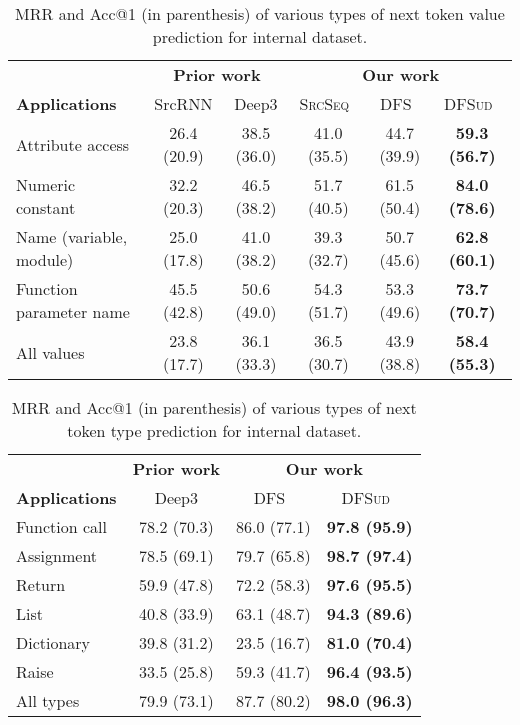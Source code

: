 \documentclass[nonacm, sigconf]{acmart}
\newcommand{\abbr}[1]{\textsc{#1}~}
\newcommand{\SrcSeq}{\abbr{SrcSeq}} \newcommand{\SrcRNN}{\abbr{SrcRNN}} \newcommand{\LeafSeq}{\abbr{LeafSeq}} \newcommand{\RootPath}{\abbr{RootPath}} \newcommand{\LeafTokens}{\abbr{LeafTokens}} \newcommand{\DFS}{\abbr{DFS}} \newcommand{\TreeRel}{\abbr{DFS{ud}}} \newcommand{\TreeReli}{\abbr{DFS{ud+}}}
\begin{document}
\begin{table*}[h]
    \centering
    \begin{tabular}{l|cc|ccc}
    \hline
                     & \multicolumn{2}{c}{\textbf{Prior work}} & \multicolumn{3}{c}{\textbf{Our work}} \\
      \textbf{Applications}           & SrcRNN & Deep3 & \SrcSeq & \DFS & \TreeRel    \\
    \hline
      Attribute access        & 26.4 (20.9) & 38.5 (36.0) & 41.0 (35.5)	& 44.7 (39.9) & \textbf{59.3 (56.7)}    \\
      Numeric constant        & 32.2 (20.3) & 46.5 (38.2) & 51.7 (40.5)	& 61.5 (50.4) &	\textbf{84.0 (78.6)}    \\
      Name (variable, module) & 25.0 (17.8) & 41.0 (38.2) & 39.3 (32.7)	& 50.7 (45.6) & \textbf{62.8 (60.1)}   \\
      Function parameter name & 45.5 (42.8) & 50.6 (49.0) & 54.3 (51.7)	& 53.3 (49.6) & \textbf{73.7 (70.7)}    \\
      All values              & 23.8 (17.7) & 36.1 (33.3) & 36.5 (30.7) & 43.9 (38.8) & \textbf{58.4 (55.3)}   \\
    \hline
    \end{tabular}
    \caption{MRR and Acc@1 (in parenthesis) of various types of next token value prediction for internal dataset.}
    \label{tab:resultsint_values}
\end{table*}

\begin{table*}[h]
    \centering
    \begin{tabular}{l|c|cc}
    \hline
                     & \textbf{Prior work} & \multicolumn{2}{c}{\textbf{Our work}} \\
      \textbf{Applications}   & Deep3 & \DFS & \TreeRel  \\
    \hline
      Function call    & 78.2 (70.3) & 86.0 (77.1)	& \textbf{97.8 (95.9)}   \\
      Assignment       & 78.5 (69.1) & 79.7 (65.8)	& \textbf{98.7 (97.4)}   \\
      Return           & 59.9 (47.8) & 72.2 (58.3)	& \textbf{97.6 (95.5)}   \\
      List             & 40.8 (33.9) & 63.1 (48.7)	& \textbf{94.3 (89.6)}   \\
      Dictionary       & 39.8 (31.2) & 23.5 (16.7)	& \textbf{81.0 (70.4)}   \\
      Raise            & 33.5 (25.8) & 59.3 (41.7)	& \textbf{96.4 (93.5)}   \\
      All types        & 79.9 (73.1) & 87.7 (80.2)	& \textbf{98.0 (96.3)}  \\
    \hline
    \end{tabular}
    \caption{MRR and Acc@1 (in parenthesis) of various types of next token type prediction for internal dataset.}
    \label{tab:resultsint_types}
\end{table*}
\end{document}

